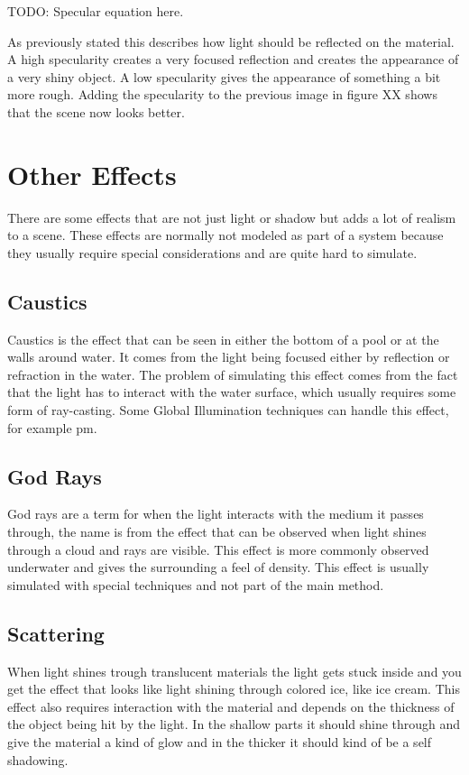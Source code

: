 TODO: Specular equation here.

As previously stated this describes how light should be reflected on the material. A high specularity creates a very focused reflection and creates the appearance of a very shiny object. A low specularity gives the appearance of something a bit more rough. Adding the specularity to the previous image in figure XX shows that the scene now looks better.

\section{Other Effects}

There are some effects that are not just light or shadow but adds a lot of realism to a scene. These effects are normally not modeled as part of a system because they usually require special considerations and are quite hard to simulate.

\subsection{Caustics}

Caustics is the effect that can be seen in either the bottom of a pool or at the walls around water. It comes from the light being focused either by reflection or refraction in the water. The problem of simulating this effect comes from the fact that the light has to interact with the water surface, which usually requires some form of ray-casting. Some Global Illumination techniques can handle this effect, for example \gls{pm}.

\subsection{God Rays}

God rays are a term for when the light interacts with the medium it passes through, the name is from the effect that can be observed when light shines through a cloud and rays are visible. This effect is more commonly observed underwater and gives the surrounding a feel of density. This effect is usually simulated with special techniques and not part of the main method.

\subsection{Scattering}

When light shines trough translucent materials the light gets stuck inside and you get the effect that looks like light shining through colored ice, like ice cream. This effect also requires interaction with the material and depends on the thickness of the object being hit by the light. In the shallow parts it should shine through and give the material a kind of glow and in the thicker it should kind of be a self shadowing.

